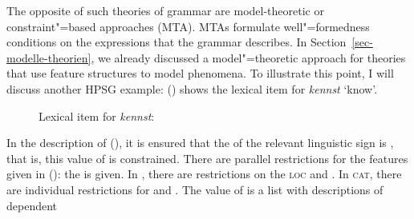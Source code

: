 The opposite of such theories of grammar are model-theoretic or constraint"=based approaches (MTA).
MTAs formulate well"=formedness conditions on the expressions that the grammar describes.
In Section~\ref{sec-modelle-theorien}, we already discussed a model"=theoretic approach for theories that use
feature structures to model phenomena. To illustrate this point, I will discuss another HPSG example:
() shows the lexical item for \emph{kennst} `know'. %
\begin{figure}
\eas
Lexical item for \emph{kennst}:\\
\label{le-kennst-mts}%
\zs
\vspace{-\baselineskip}
\end{figure}
In the description of (), it is ensured that the \phonv of the relevant linguistic sign is
, that is, this value of \phon is constrained. There are parallel restrictions for the features given in (): the \synsemv
is given. In \synsem, there are restrictions on the \textsc{loc} and \nonlocv. In \textsc{cat}, there are
individual restrictions for \head and \subcat. The value of \subcat is a list with descriptions of dependent
